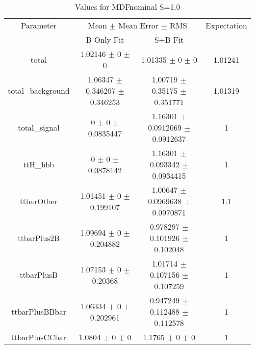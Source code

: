 \begin{table}
\centering
\caption{Values for MDFnominal S=1.0}
\begin{tabular}{cccc}
\toprule
Parameter & \multicolumn{2}{c}{Mean $\pm$ Mean Error $\pm$ RMS} & Expectation\\
 & B-Only Fit & S+B Fit & \\
\midrule
total & \num{1.02146} $\pm$ \num{0} $\pm$ \num{0} & \num{1.01335} $\pm$ \num{0} $\pm$ \num{0} & \num{1.01241}\\
total\_background & \num{1.06347} $\pm$ \num{0.346207} $\pm$ \num{0.346253} & \num{1.00719} $\pm$ \num{0.35175} $\pm$ \num{0.351771} & \num{1.01319}\\
total\_signal & \num{0} $\pm$ \num{0} $\pm$ \num{0.0835447} & \num{1.16301} $\pm$ \num{0.0912069} $\pm$ \num{0.0912637} & \num{1}\\
ttH\_hbb & \num{0} $\pm$ \num{0} $\pm$ \num{0.0878142} & \num{1.16301} $\pm$ \num{0.093342} $\pm$ \num{0.0934415} & \num{1}\\
ttbarOther & \num{1.01451} $\pm$ \num{0} $\pm$ \num{0.199107} & \num{1.00647} $\pm$ \num{0.0969638} $\pm$ \num{0.0970871} & \num{1.1}\\
ttbarPlus2B & \num{1.09694} $\pm$ \num{0} $\pm$ \num{0.204882} & \num{0.978297} $\pm$ \num{0.101926} $\pm$ \num{0.102048} & \num{1}\\
ttbarPlusB & \num{1.07153} $\pm$ \num{0} $\pm$ \num{0.20368} & \num{1.01714} $\pm$ \num{0.107156} $\pm$ \num{0.107259} & \num{1}\\
ttbarPlusBBbar & \num{1.06334} $\pm$ \num{0} $\pm$ \num{0.202961} & \num{0.947249} $\pm$ \num{0.112488} $\pm$ \num{0.112578} & \num{1}\\
ttbarPlusCCbar & \num{1.0804} $\pm$ \num{0} $\pm$ \num{0} & \num{1.1765} $\pm$ \num{0} $\pm$ \num{0} & \num{1}\\
\bottomrule
\end{tabular}
\end{table}